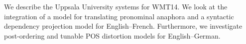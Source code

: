 We describe the Uppsala University systems for WMT14. We look at the integration of a model for translating pronominal anaphora and a syntactic dependency projection model for English--French. Furthermore, we investigate post-ordering and tunable POS distortion models for English--German.
